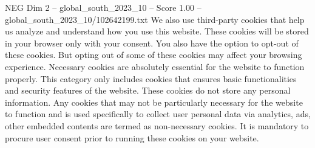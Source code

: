 \begin{textsample}{NEG Dim 2 – global\_south\_2023\_10 – Score 1.00 – global\_south\_2023\_10/102642199.txt}
We also use third-party cookies that help us analyze and understand how you use this website.
These cookies will be stored in your browser only with your consent.
You also have the option to opt-out of these cookies.
But opting out of some of these cookies may affect your browsing experience.
Necessary cookies are absolutely essential for the website to function properly.
This category only includes cookies that ensures basic functionalities and security features of the website.
These cookies do not store any personal information.
Any cookies that may not be particularly necessary for the website to function and is used specifically to collect user personal data via analytics, ads, other embedded contents are termed as non-necessary cookies.
It is mandatory to procure user consent prior to running these cookies on your website.

\end{textsample}
